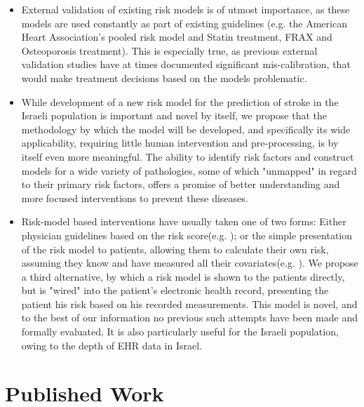 \documentclass[a4paper,12pt]{article}
\begin{document}
	\begin{itemize}
		
		\item External validation of existing risk models is of utmost importance\cite{Moons2012}, as these models are used constantly as part of existing guidelines (e.g. the American Heart Association's pooled risk model and Statin treatment\cite{Goff2014}, FRAX and Osteoporosis treatment\cite{Kanis2008}). This is especially true, as previous external validation studies have at times documented significant mis-calibration\cite{Bastuji-Garin2002,Dagan2017}, that would make treatment decisions based on the models problematic.
		
		\item While development of a new risk model for the prediction of stroke in the Israeli population is important and novel by itself, we propose that the methodology by which the model will be developed, and specifically its wide applicability, requiring little human intervention and pre-processing, is by itself even more meaningful. The ability to identify risk factors and construct models for a wide variety of pathologies, some of which "unmapped" in regard to their primary risk factors, offers a promise of better understanding and more focused interventions to prevent these diseases.
		
		\item Risk-model based interventions have usually taken one of two forms: Either physician guidelines based on the risk score(e.g. \cite{Hippisley-Cox2008,DAgostino2008}); or the simple presentation of the risk model to patients, allowing them to calculate their own risk, assuming they know and have measured all their covariates(e.g. \cite{Parmar2015}). We propose a third alternative, by which a risk model is shown to the patients directly, but is "wired" into the patient's electronic health record, presenting the patient his risk based on his recorded measurements. This model is novel, and to the best of our information no previous such attempts have been made and formally evaluated. It is also particularly useful for the Israeli population, owing to the depth of EHR data in Israel\cite{Lovis2015}.
		
	\end{itemize}
	
	\section{Published Work}
	
\end{document}

